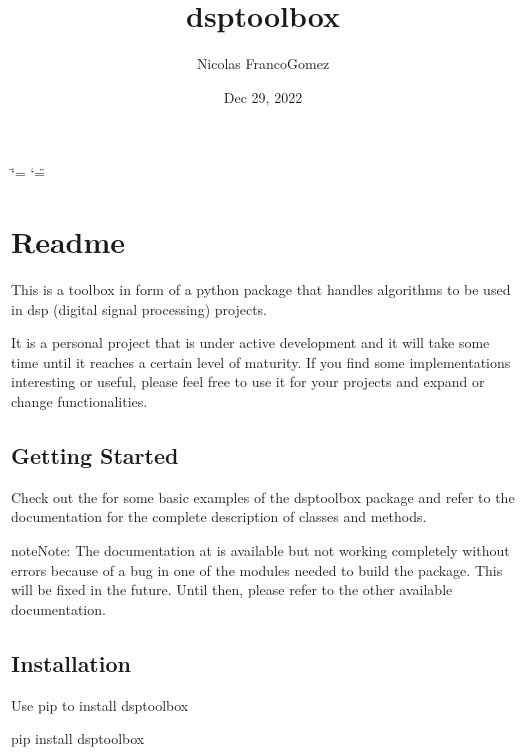 \documentclass[letterpaper,10pt,english]{sphinxmanual}
\title{dsptoolbox}
\date{Dec 29, 2022}
\author{Nicolas Franco\sphinxhyphen{}Gomez}
\begin{document}
\ifdefined\shorthandoff
  \ifnum\catcode`\=\string=\active\shorthandoff{=}\fi
  \ifnum\catcode`\"=\active{}\fi
\fi

\pagestyle{empty}
\sphinxmaketitle
\pagestyle{plain}
\sphinxtableofcontents
\pagestyle{normal}
\label{\detokenize{index::doc}}


\sphinxstepscope


\chapter{Readme}
\label{\detokenize{readme:readme}}\label{\detokenize{readme::doc}}
\sphinxAtStartPar
This is a toolbox in form of a python package that handles algorithms to be used in dsp (digital signal processing) projects.

\sphinxAtStartPar
It is a personal project that is under active development and it will take some time until it reaches a certain level of maturity.
If you find some implementations interesting or useful, please feel free to use it for your projects and expand or change
functionalities.


\section{Getting Started}
\label{\detokenize{readme:getting-started}}
\sphinxAtStartPar
Check out the  for some basic examples of the dsptoolbox package
and refer to the documentation for the complete description of classes and methods.

\begin{sphinxadmonition}{note}{Note:}
\sphinxAtStartPar
The documentation at  is available but not working completely without errors
because of a bug in one of the modules needed to build the package. This will be fixed in the future.
Until then, please refer to the other available documentation.
\end{sphinxadmonition}


\section{Installation}
\label{\detokenize{readme:installation}}
\sphinxAtStartPar
Use pip to install dsptoolbox

\begin{sphinxVerbatim}[commandchars=\\\{\}]
pip install dsptoolbox
\end{sphinxVerbatim}
\end{document}
